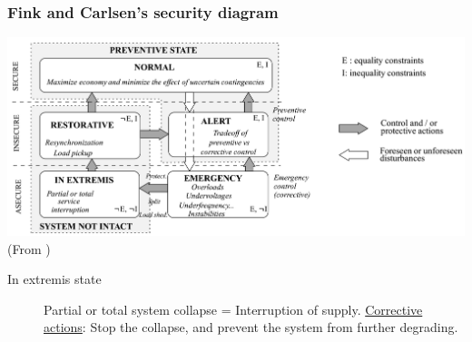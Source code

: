 \documentclass[compress]{beamer}
\newcommand*{\citec}[1]{(From \cite{#1})}
\begin{document}
\begin{frame}
\frametitle{Fink and Carlsen's security diagram}
\centering
\includegraphics[width=\textwidth]{Figs/FinkCarlsen_SecurityDiagram.png}\\
\citec{Fink1978Operating}
\begin{description}
\item[In extremis state] Partial or total system collapse = Interruption of supply. \underline{Corrective actions}: Stop the collapse, and prevent the system from further degrading.
\end{description}
\end{frame}
\end{document}

